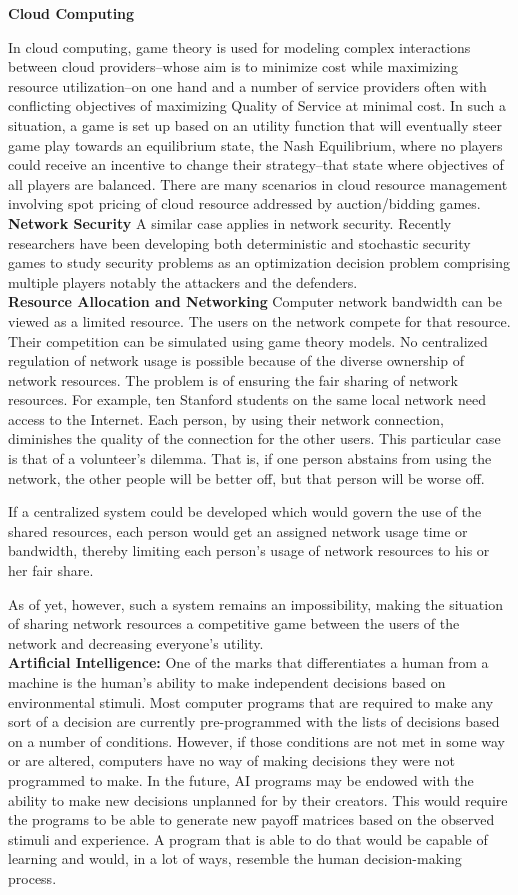 \textbf{\large Cloud Computing}

In cloud computing, game theory is used for modeling complex interactions between cloud providers--whose aim is to minimize cost while maximizing resource utilization--on one hand and  a number of service providers often with conflicting objectives of maximizing Quality of Service at minimal cost. In such a situation, a game is set up based on an utility function that will eventually steer game play towards an equilibrium state, the Nash Equilibrium, where no players could receive an incentive to change their strategy--that state where objectives of all players are balanced. There are many scenarios in cloud resource management involving spot pricing of cloud resource addressed by auction/bidding games. \\
\textbf{\large Network Security}
A similar case applies in network security. Recently researchers have been developing both deterministic and stochastic security games to study security problems  as an optimization decision problem comprising multiple players notably the attackers and  the  defenders. \\
\textbf{\large Resource Allocation and Networking}
Computer network bandwidth can be viewed as a limited resource. The users on the network compete for that resource. Their competition can be simulated using game theory models. No centralized regulation of network usage is possible because of the diverse ownership of network resources.
The problem is of ensuring the fair sharing of network resources. For example, ten Stanford students on the same local network need access to the Internet. Each person, by using their network connection, diminishes the quality of the connection for the other users. This particular case is that of a volunteer's dilemma. That is, if one person abstains from using the network, the other people will be better off, but that person will be worse off.

If a centralized system could be developed which would govern the use of the shared resources, each person would get an assigned network usage time or bandwidth, thereby limiting each person's usage of network resources to his or her fair share.

As of yet, however, such a system remains an impossibility, making the situation of sharing network resources a competitive game between the users of the network and decreasing everyone's utility. \\
\textbf{\large Artificial Intelligence: }
One of the marks that differentiates a human from a machine is the human's ability to make independent decisions based on environmental stimuli. Most computer programs that are required to make any sort of a decision are currently pre-programmed with the lists of decisions based on a number of conditions. However, if those conditions are not met in some way or are altered, computers have no way of making decisions they were not programmed to make.
In the future, AI programs may be endowed with the ability to make new decisions unplanned for by their creators. This would require the programs to be able to generate new payoff matrices based on the observed stimuli and experience. A program that is able to do that would be capable of learning and would, in a lot of ways, resemble the human decision-making process.